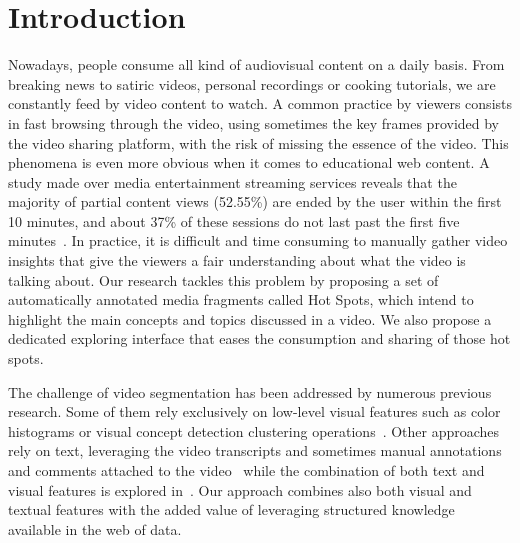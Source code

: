 \documentclass{llncs}
\begin{document}
\section{Introduction}
\label{sec:introduction}
Nowadays, people consume all kind of audiovisual content on a daily basis. From breaking news to satiric videos, personal recordings or cooking tutorials, we are constantly feed by video content to watch. A common practice by viewers consists in fast browsing through the video, using sometimes the key frames provided by the video sharing platform, with the risk of missing the essence of the video. This phenomena is even more obvious when it comes to educational web content. A study made over media entertainment streaming services reveals that the majority of partial content views (52.55\%) are ended by the user within the first 10 minutes, and about 37\% of these sessions do not last past the first five minutes~\cite{Yu2006}. In practice, it is difficult and time consuming to manually gather video insights that give the viewers a fair understanding about what the video is talking about. Our research tackles this problem by proposing a set of automatically annotated media fragments called Hot Spots, which intend to highlight the main concepts and topics discussed in a video. We also propose a dedicated exploring interface that eases the consumption and sharing of those hot spots.

The challenge of video segmentation has been addressed by numerous previous research. Some of them rely exclusively on low-level visual features such as color histograms or visual concept detection clustering operations~\cite{snoek2005multimodal}. Other approaches rely on text, leveraging the video transcripts and sometimes manual annotations and comments attached to the video~\cite{zha2012text} while the combination of both text and visual features is explored in~\cite{chang2005combining}. Our approach combines also both visual and textual features with the added value of leveraging structured knowledge available in the web of data.

\end{document}
